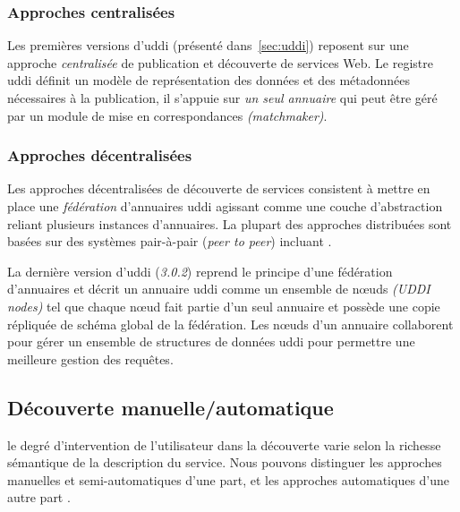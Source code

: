     \subsubsection{Approches centralisées}
    \label{sec:ws-localisation-centr}
    Les premières versions d'\acrshort{uddi} \cite{clement2004uddi}
    (présenté dans~\ref{sec:uddi}) reposent sur une approche
    \textit{centralisée} de publication et découverte de services Web.
    Le registre \acrshort{uddi} définit un modèle de représentation
    des données et des métadonnées nécessaires à la publication, il
    s'appuie sur \textit{un seul annuaire} qui peut être géré par un
    module de mise en correspondances \textit{(matchmaker)}.

    \subsubsection{Approches décentralisées}
    \label{sec:ws-localisation-distr}
    Les approches décentralisées de découverte de services
    \cite{rompothong2003query, sivashanmugam2004discovery,
      paolucci2003using, schmidt2004peer, verma2005meteor,
      sahin2005spider} consistent à mettre en place une
    \textit{fédération} d'annuaires \acrshort{uddi} agissant comme une
    couche d'abstraction reliant plusieurs instances d'annuaires. La
    plupart des approches distribuées sont basées sur des systèmes
    pair-à-pair (\textit{peer to peer}) incluant
    \cite{schmidt2004peer, verma2005meteor, sahin2005spider}.\medskip

    La dernière version d'\acrshort{uddi}
    \cite{oasis2005specification} (\textit{3.0.2}) reprend le principe
    d'une fédération d'annuaires et décrit un annuaire \acrshort{uddi}
    comme un ensemble de nœuds \textit{(UDDI nodes)} tel que chaque
    nœud fait partie d'un seul annuaire et possède une copie répliquée
    de schéma global de la fédération. Les nœuds d'un annuaire
    collaborent pour gérer un ensemble de structures de données
    \acrshort{uddi} pour permettre une meilleure gestion des requêtes.

  \subsection{Découverte manuelle/automatique}
  \label{sec:ws-desc:manual-vs-auto}
  le degré d'intervention de l'utilisateur dans la découverte varie
  selon la richesse sémantique de la description du service. Nous
  pouvons distinguer les approches manuelles et semi-automatiques
  d'une part, et les approches automatiques d'une autre part
  \cite{elie2010,garofalakis2004web}.

